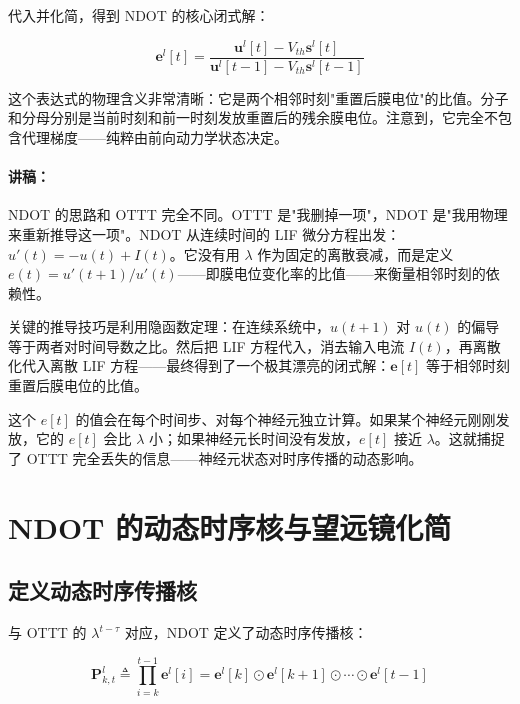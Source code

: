 \documentclass[journal,12pt,onecolumn]{IEEEtran}
\begin{document}
代入并化简，得到 NDOT 的核心闭式解：

\begin{equation}
\boxed{
\mathbf{e}^{l}[t] =
\frac{\mathbf{u}^{l}[t] - V_{th}\mathbf{s}^{l}[t]}
     {\mathbf{u}^{l}[t-1] - V_{th}\mathbf{s}^{l}[t-1]}
}
\label{eq.ndot_e}
\end{equation}

这个表达式的物理含义非常清晰：它是两个相邻时刻"重置后膜电位"的比值。分子和分母分别是当前时刻和前一时刻发放重置后的残余膜电位。注意到，它完全不包含代理梯度——纯粹由前向动力学状态决定。

\paragraph{讲稿：}
NDOT 的思路和 OTTT 完全不同。OTTT 是"我删掉一项"，NDOT 是"我用物理来重新推导这一项"。NDOT 从连续时间的 LIF 微分方程出发：$u'(t) = -u(t) + I(t)$。它没有用 $\lambda$ 作为固定的离散衰减，而是定义 $e(t) = u'(t+1) / u'(t)$——即膜电位变化率的比值——来衡量相邻时刻的依赖性。

关键的推导技巧是利用隐函数定理：在连续系统中，$u(t+1)$ 对 $u(t)$ 的偏导等于两者对时间导数之比。然后把 LIF 方程代入，消去输入电流 $I(t)$，再离散化代入离散 LIF 方程——最终得到了一个极其漂亮的闭式解：$\mathbf{e}[t]$ 等于相邻时刻重置后膜电位的比值。

这个 $e[t]$ 的值会在每个时间步、对每个神经元独立计算。如果某个神经元刚刚发放，它的 $e[t]$ 会比 $\lambda$ 小；如果神经元长时间没有发放，$e[t]$ 接近 $\lambda$。这就捕捉了 OTTT 完全丢失的信息——神经元状态对时序传播的动态影响。

\section{NDOT 的动态时序核与望远镜化简}

\subsection*{定义动态时序传播核}

与 OTTT 的 $\lambda^{t-\tau}$ 对应，NDOT 定义了动态时序传播核：

\begin{equation}
\mathbf{P}_{k,t}^{l} \triangleq \prod_{i=k}^{t-1} \mathbf{e}^{l}[i]
= \mathbf{e}^{l}[k] \odot \mathbf{e}^{l}[k+1] \odot \cdots \odot \mathbf{e}^{l}[t-1]
\label{eq.P_def}
\end{equation}
\end{document}

